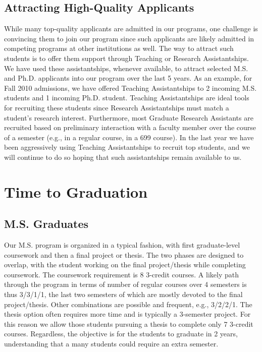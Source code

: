 \documentclass[12pt]{article}
\begin{document}
\subsection{Attracting High-Quality Applicants}

While many top-quality applicants are admitted in our programs,
one challenge is convincing them to join our program since such 
applicants are likely admitted in competing programs at other
institutions as well. The way to attract such students is to offer
them support through Teaching or Research Assistantships. We have used
these assistantships, whenever available, to attract selected M.S. and
Ph.D. applicants into our program over the last 5 years. As an
example, for Fall 2010 admissions, we have offered Teaching
Assistantships to 2 incoming M.S.  students and 1 incoming Ph.D.
student. Teaching Assistantships are ideal tools for recruiting these
students since Research Assistantships must match a student's research
interest. Furthermore, most Graduate Research Assistants are recruited
based on preliminary interaction with a faculty member over the course
of a semester (e.g., in a regular course, in a 699 course). In the
last year we have been aggressively using Teaching Assistantships to
recruit top students, and we will continue to do so hoping that such
assistantships remain available to us.


\section{Time to Graduation}
\label{sec.time}

\subsection{M.S. Graduates}
\label{sec.time.ms}

Our M.S. program is organized in a typical fashion, with first
graduate-level coursework and then a final project or thesis. The two
phases are designed to overlap, with the student working on the final
project/thesis while completing coursework. The coursework requirement
is 8 3-credit courses. A likely path through the program in terms of
number of regular courses over 4 semesters is thus 3/3/1/1, the last
two semesters of which are mostly devoted to the final project/thesis.
Other combinations are possible and frequent, e.g., 3/2/2/1.  The
thesis option often requires more time and is typically a 3-semester
project. For this reason we allow those students pursuing a thesis to
complete only 7 3-credit courses. Regardless, the objective is for the
students to graduate in 2 years, understanding that a many students
could require an extra semester.
\end{document}
